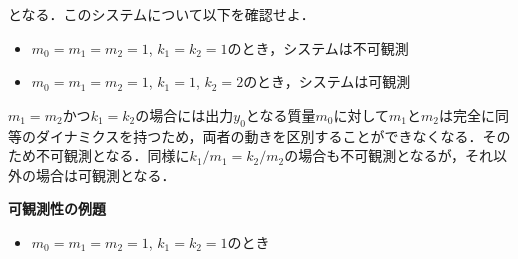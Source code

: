 \documentclass[a4paper,11pt]{jreport}
\begin{document}
となる．このシステムについて以下を確認せよ．
\begin{itemize}
\item $m_0=m_1=m_2=1$, $k_1=k_2=1$のとき，システムは不可観測
\item $m_0=m_1=m_2=1$, $k_1=1$, $k_2=2$のとき，システムは可観測
\end{itemize}
$m_1=m_2$かつ$k_1=k_2$の場合には出力$y_0$となる質量$m_0$に対して$m_1$と$m_2$は完全に同等のダイナミクスを持つため，両者の動きを区別することができなくなる．そのため不可観測となる．同様に$k_1/m_1 = k_2/m_2$の場合も不可観測となるが，それ以外の場合は可観測となる．

\newpage

\noindent
{\bf 可観測性の例題}

\begin{itemize}
\item $m_0=m_1=m_2=1$, $k_1=k_2=1$のとき
\end{itemize}
\end{document}
